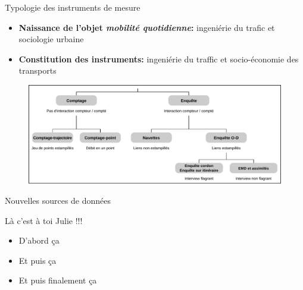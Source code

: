 \documentclass{beamer}
\begin{document}
\begin{frame}{Typologie des instruments de mesure}

\begin{itemize}
  \item \textbf{Naissance de l'objet \textit{mobilité quotidienne}:} ingeniérie du trafic et sociologie urbaine
  \item \textbf{Constitution des instruments:} ingeniérie du traffic et socio-économie des transports
\end{itemize}

\begin{figure}
  \includegraphics[width=12cm]{TypesEnquetes.pdf}
\end{figure}

\end{frame}






\begin{frame}{Nouvelles sources de données}

Là c'est à toi Julie !!!

\begin{itemize}
  \item D'abord ça
  \item Et puis ça
  \item Et puis finalement ça
\end{itemize}

\end{frame}
\end{document}

